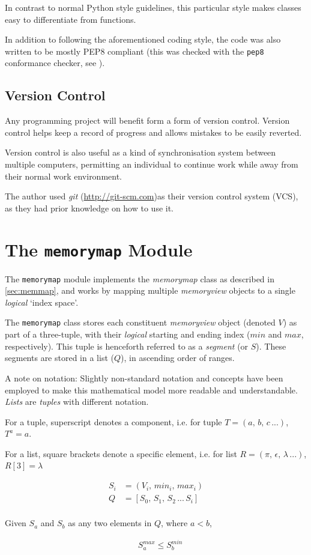\documentclass[10pt,a4paper,notitlepage,twoside]{report}
\begin{document}
In contrast to normal Python style guidelines, this particular style makes classes easy to differentiate from functions.

In addition to following the aforementioned coding style, the code was also written to be mostly PEP8\cite{pep8} compliant (this was checked with the \texttt{pep8} conformance checker, see \cite{pep8chk}).

\subsection{Version Control}
Any programming project will benefit form a form of version control. Version control helps keep a record of progress and allows mistakes to be easily reverted.

Version control is also useful as a kind of synchronisation system between multiple computers, permitting an individual to continue work while away from their normal work environment.

The author used \emph{git} (\url{http://git-scm.com})as their version control system (VCS), as they had prior knowledge on how to use it.

\section{The \texttt{memorymap} Module}
The \texttt{memorymap} module implements the \emph{memorymap} class as described in \ref{sec:memmap}, and works by mapping multiple \emph{memoryview} objects to a single \emph{logical} `index space'.

The \texttt{memorymap} class stores each constituent \emph{memoryview} object (denoted $V$) as part of a three-tuple,  with their \emph{logical} starting and ending index ($min$ and $max$, respectively). This tuple is henceforth referred to as a \emph{segment} (or $S$). These segments are stored in a list ($Q$), in ascending order of ranges.

{\small
A note on notation: Slightly non-standard notation and concepts have been employed to make this mathematical model more readable and understandable. \emph{Lists} are \emph{tuples} with different notation.

For a tuple, superscript denotes a component, i.e.  for tuple $T = (a,\, b,\, c\, ...)$,   $T^{a} = a$.

For a list, square brackets denote a specific element, i.e. for list $R = (\pi,\, \epsilon,\, \lambda\, ...)$, $R[3] = \lambda$
}

\begin{align*}
S_{i} &= ( V_{i},\, min_{i},\, max_{i} )\\
Q &= [ S_{0},\, S_{1},\, S_{2}\, ... \,S_{i} ]\\
\end{align*}
\begin{center}
Given $S_{a}$ and $S_{b}$ as any two elements in $Q$, where $a < b$,
\end{center}
\begin{align*}
&\ S_{a}^{max} \leq S_{b}^{min} 
\end{align*}
\end{document}
